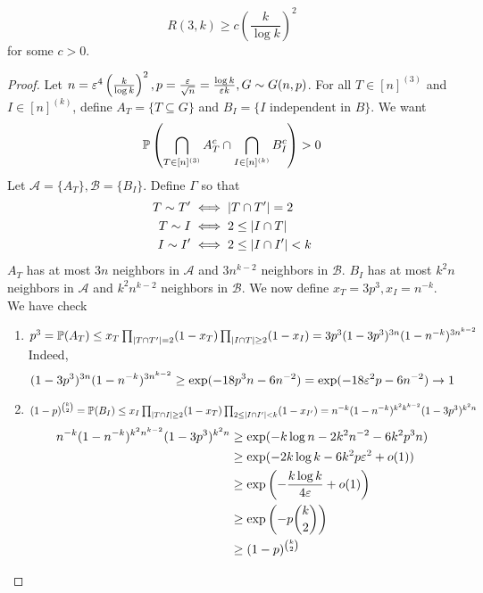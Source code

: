 \documentclass{article}
\begin{document}
\begin{thm}[Erd\H os, 1961]
  $$R(3, k) \ge c\left(\frac k{\log k}\right)^2$$
  for some $c > 0$.
\end{thm}
\begin{proof}
  Let $n = \varepsilon^4\left(\frac k{\log k}\right)^2, p = \frac{\varepsilon}{\sqrt n} = \frac{\log k}{\varepsilon k}, G \sim G(n, p)$. For all $T \in [n]^{(3)}$ and $I \in [n]^{(k)}$, define $A_T = \{T \subseteq G\}$ and $B_I = \{I \text{ independent in }B\}$. We want
  $$\mathbb P\left(\bigcap_{T \in [n]^{(3)}} A_T^c \cap \bigcap_{I \in [n]^{(k)}} B_I^c\right) > 0$$
  Let $\mathcal A = \{A_T\}, \mathcal B = \{B_I\}$. Define $\Gamma$ so that \begin{align*}
    T \sim T' & \iff \left\lvert T \cap T'\right\rvert = 2 \\
    T \sim I & \iff 2 \le \left\lvert I \cap T\right\rvert \\
    I \sim I' & \iff 2 \le \left\lvert I \cap I'\right\rvert < k
  \end{align*}
  $A_T$ has at most $3n$ neighbors in $\mathcal A$ and $3n^{k - 2}$ neighbors in $\mathcal B$. $B_I$ has at most $k^2n$ neighbors in $\mathcal A$ and $k^2n^{k - 2}$ neighbors in $\mathcal B$. We now define $x_T = 3p^3, x_I = n^{-k}$. We have check
  \begin{enumerate}
    \item $p^3 = \mathbb P(A_T) \le x_T \prod_{\left\lvert T \cap T'\right\rvert = 2} (1 - x_T) \prod_{\left\lvert I \cap T\right\rvert \ge 2} (1 - x_I) = 3p^3 (1 - 3p^3)^{3n}(1 - n^{-k})^{3n^{k - 2}}$
    Indeed,
    $$(1 - 3p^3)^{3n}(1 - n^{-k})^{3n^{k - 2}} \ge \exp(-18p^3n - 6n^{-2}) = \exp(-18\varepsilon^2 p - 6n^{-2}) \rightarrow 1$$

\newlec

    \item $(1 - p)^{\binom k2} = \mathbb P(B_I) \le x_I \prod_{\left\lvert T \cap I\right\rvert \ge 2}(1 - x_T) \prod_{2 \le \left\lvert I \cap I'\right\rvert < k} (1 - x_{I'}) = n^{-k}(1 - n^{-k})^{k^2k^{k - 2}}(1 - 3p^3)^{k^2n}$
    \begin{align*}
      n^{-k}(1 - n^{-k})^{k^2n^{k - 2}}(1 - 3p^3)^{k^2n}
      & \ge \exp(-k\log n - 2k^2n^{-2} - 6k^2p^3n) \\
      & \ge \exp(-2k\log k - 6k^2p\varepsilon^2 + o(1)) \\
      & \ge \exp\left(-\frac{k\log k}{4\varepsilon} + o(1)\right) \\
      & \ge \exp\left(-p\binom k2\right) \\
      & \ge (1 - p)^{\binom k2}
    \end{align*}
  \end{enumerate}
\end{proof}
\end{document}
